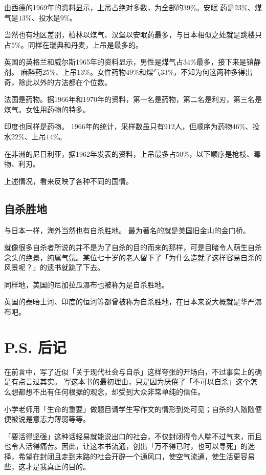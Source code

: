\documentclass[UTF8]{ctexart}
\begin{document}
由西德的1969年的资料显示，上吊占绝对多数，为全部的$39\%$。安眠 药是$23\%$、煤气是$13\%$、投水是$9\%$。

当然也有地区差别，柏林以煤气、汉堡以安眠药最多，与日本相似之处就是跳楼只占$5\%$。同样在瑞典和丹麦，上吊是最多的。

英国的英格兰和威尔斯1965年的资料显示，男性是煤气占$34\%$最多，接下来是镇静剂。 
麻醉药$25\%$、上吊$13\%$。女性药物$49\%$和煤气$33\%$，不知为何这两种多得出奇，除此以外的方法都在个位数。

法国是药物。据1966年和1970年的资料，第一名是药物，第二名是利刃，第三名是煤气。女性用药物的特多。

印度也同样是药物。
1966年的统计，采样数虽只有$912$人，但顺序为药物$46\%$、投水$22\%$、上吊$14\%$。

在非洲的尼日利亚，据1962年发表的资料，上吊最多占$50\%$，以下顺序是枪枝、毒物、利刃。

上述情况，看来反映了各种不同的国情。

\subsection{自杀胜地}

与日本一样，海外当然也有自杀胜地。
最为著名的就是美国旧金山的金门桥。

就像很多自杀者所说的并不是为了自杀的目的而来的那样，可是目睹令人萌生自杀念头的绝景，纯属气氛。某位七十岁的老人留下了「为什么造就了这样容易自杀的风景呢？」的遗书就跳了下去。

同样地，美国的尼加拉瓜瀑布也被称为是自杀胜地。

英国的泰晤士河、印度的恒河等都曾被称为自杀胜地，在日本来说大概就是华严瀑布吧。



\newpage

\section{P.S. 后记}

在前言中，写了近似「关于现代社会与自杀」这样夸张的开场白，不过事实上的确是有点言过其实。
写这本书的最初理由，只是因为厌倦了「不可以自杀」这个怎么想都想不出有任何根据的观念，却受到大众非常单纯的信任。

小学老师用「生命的重要」做题目请学生写作文的情形到处可见；自杀的人随随便便被说是意志力薄弱等等。

「要活得坚强」这种话轻易就能说出口的社会，不仅封闭得令人喘不过气来，而且也令人活得痛苦。因此，让这本书流通，创出「万不得已时，也可以寻死」的选择，希望在封闭且走到末路的社会开辟一个通风口，使空气流通，使生活更容易些，这才是我真正的目的。
\end{document}
